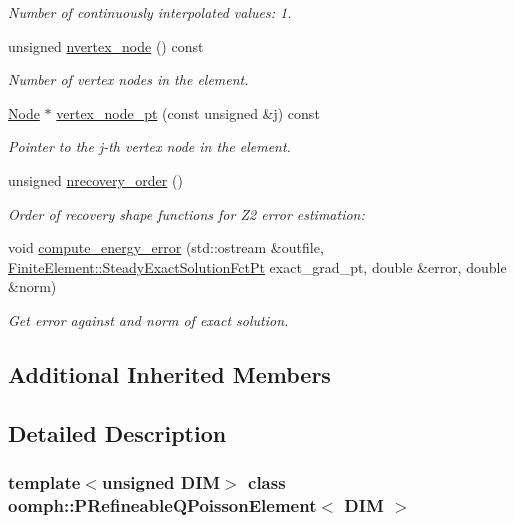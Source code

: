 \begin{DoxyCompactItemize}
\begin{DoxyCompactList}\small\item\em Number of continuously interpolated values\+: 1. \end{DoxyCompactList}\item 
unsigned \hyperlink{classoomph_1_1PRefineableQPoissonElement_a9640f654f06259a532a62a23ed5f3ac7}{nvertex\+\_\+node} () const
\begin{DoxyCompactList}\small\item\em Number of vertex nodes in the element. \end{DoxyCompactList}\item 
\hyperlink{classoomph_1_1Node}{Node} $\ast$ \hyperlink{classoomph_1_1PRefineableQPoissonElement_a37421434b215d1f0ee298c09839ed2ea}{vertex\+\_\+node\+\_\+pt} (const unsigned \&j) const
\begin{DoxyCompactList}\small\item\em Pointer to the j-\/th vertex node in the element. \end{DoxyCompactList}\item 
unsigned \hyperlink{classoomph_1_1PRefineableQPoissonElement_a19ed70ed56d1e15f8af6eb6ad4a2d892}{nrecovery\+\_\+order} ()
\begin{DoxyCompactList}\small\item\em Order of recovery shape functions for Z2 error estimation\+: \end{DoxyCompactList}\item 
void \hyperlink{classoomph_1_1PRefineableQPoissonElement_a9e4b30c3983caf8b74707743d296626f}{compute\+\_\+energy\+\_\+error} (std\+::ostream \&outfile, \hyperlink{classoomph_1_1FiniteElement_a690fd33af26cc3e84f39bba6d5a85202}{Finite\+Element\+::\+Steady\+Exact\+Solution\+Fct\+Pt} exact\+\_\+grad\+\_\+pt, double \&error, double \&norm)
\begin{DoxyCompactList}\small\item\em Get error against and norm of exact solution. \end{DoxyCompactList}\end{DoxyCompactItemize}
\subsection*{Additional Inherited Members}


\subsection{Detailed Description}
\subsubsection*{template$<$unsigned D\+IM$>$\newline
class oomph\+::\+P\+Refineable\+Q\+Poisson\+Element$<$ D\+I\+M $>$}

